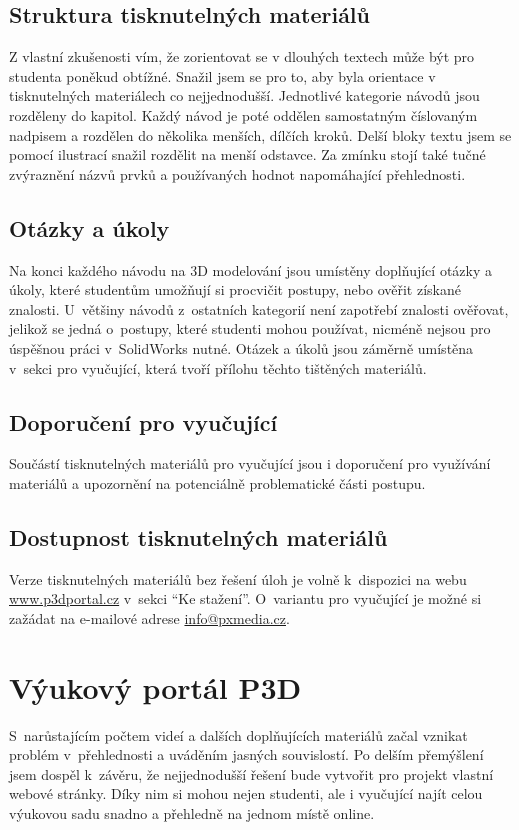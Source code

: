 \subsection{Struktura tisknutelných materiálů}
Z vlastní zkušenosti vím, že zorientovat se v dlouhých textech může být pro studenta poněkud obtížné.
Snažil jsem se pro to, aby byla orientace v tisknutelných materiálech co nejjednodušší.
Jednotlivé kategorie návodů jsou rozděleny do kapitol.
Každý návod je poté oddělen samostatným číslovaným nadpisem a rozdělen do několika menších, dílčích kroků.
Delší bloky textu jsem se pomocí ilustrací snažil rozdělit na menší odstavce.
Za zmínku stojí také tučné zvýraznění názvů prvků a používaných hodnot napomáhající přehlednosti.

\subsection{Otázky a úkoly}
Na konci každého návodu na 3D modelování jsou umístěny doplňující otázky a úkoly, které studentům umožňují si procvičit postupy, nebo ověřit získané znalosti.
U~většiny návodů z~ostatních kategorií není zapotřebí znalosti ověřovat, jelikož se jedná o~postupy, které studenti mohou používat, nicméně nejsou pro úspěšnou práci v~SolidWorks nutné.
Otázek a úkolů jsou záměrně umístěna v~sekci pro vyučující, která tvoří přílohu těchto tištěných materiálů.

\subsection*{Doporučení pro vyučující}
Součástí tisknutelných materiálů pro vyučující jsou i doporučení pro využívání materiálů a upozornění na potenciálně problematické části postupu.

\subsection{Dostupnost tisknutelných materiálů}
Verze tisknutelných materiálů bez řešení úloh je volně k~dispozici na webu \href{https://www.p3dportal.cz}{www.p3dportal.cz} v~sekci \enquote{Ke stažení}.
O~variantu pro vyučující je možné si zažádat na e-mailové adrese \href{mailto:info@pxmedia.cz}{info@pxmedia.cz}.

\section{Výukový portál P3D}
S~narůstajícím počtem videí a dalších doplňujících materiálů začal vznikat problém v~přehlednosti a uváděním jasných souvislostí.
Po delším přemýšlení jsem dospěl k~závěru, že nejjednodušší řešení bude vytvořit pro projekt vlastní webové stránky.
Díky nim si mohou nejen studenti, ale i vyučující najít celou výukovou sadu snadno a přehledně na jednom místě online.


